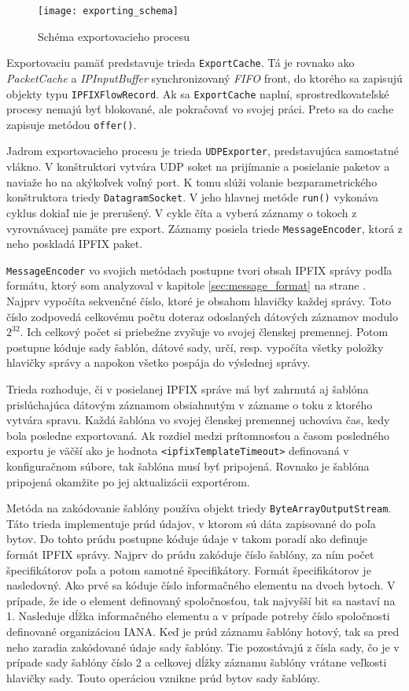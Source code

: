 \begin{figure}[ht!]
\centering
\texttt{[image: exporting\_schema]}
\caption{Schéma exportovacieho procesu}\label{o:exporting_schema}
\end{figure}

Exportovaciu pamäť predstavuje trieda \verb|ExportCache|. Tá je rovnako ako \emph{PacketCache} a 
\emph{IPInputBuffer} synchronizovaný \emph{FIFO} front, do ktorého sa zapisujú objekty typu 
\verb|IPFIXFlowRecord|. Ak sa \verb|ExportCache| naplní, sprostredkovateľské procesy nemajú byť blokované, 
ale pokračovať vo svojej práci. Preto sa do cache zapisuje metódou \verb|offer()|.

Jadrom exportovacieho procesu je trieda \verb|UDPExporter|, predstavujúca samostatné vlákno. V 
konštruktori vytvára UDP soket na prijímanie a posielanie paketov a naviaže ho na akýkoľvek voľný port.
K tomu slúži volanie bezparametrického konštruktora triedy \verb|DatagramSocket|. V jeho hlavnej metóde 
\verb|run()| vykonáva cyklus dokiaľ nie je prerušený. V cykle číta a vyberá záznamy o tokoch z 
vyrovnávacej pamäte pre export. Záznamy posiela triede \verb|MessageEncoder|, ktorá z neho poskladá 
IPFIX paket.

\verb|MessageEncoder| vo svojich metódach postupne tvori obsah IPFIX správy podľa formátu, ktorý som 
analyzoval v kapitole \ref{sec:message_format} na strane \pageref{sec:message_format}. Najprv vypočíta 
sekvenčné číslo, ktoré je obsahom hlavičky každej správy. Toto číslo zodpovedá celkovému počtu doteraz 
odoslaných dátových záznamov modulo $2^{32}$. Ich celkový počet si priebežne zvyšuje vo svojej členskej 
premennej. Potom postupne kóduje sady šablón, dátové sady, určí, resp. vypočíta všetky položky 
hlavičky správy a napokon všetko pospája do výslednej správy.

Trieda rozhoduje, či v posielanej IPFIX správe má byť zahrnutá aj šablóna prislúchajúca dátovým záznamom
obsiahnutým v zázname o toku z ktorého vytvára spravu. Každá šablóna vo svojej členskej premennej uchováva
čas, kedy bola posledne exportovaná. Ak rozdiel medzi prítomnosťou a časom posledného exportu je väčší ako 
je hodnota \verb|<ipfixTemplateTimeout>| definovaná v konfiguračnom súbore, tak šablóna musí byť pripojená.
Rovnako je šablóna pripojená okamžite po jej aktualizácii exportérom. 

Metóda na zakódovanie šablóny používa objekt triedy \verb|ByteArrayOutputStream|. Táto trieda 
implementuje prúd údajov, v ktorom sú dáta zapisované do poľa bytov. Do tohto prúdu postupne kóduje údaje 
v takom poradí ako definuje formát IPFIX správy. Najprv do prúdu zakóduje číslo šablóny, za ním 
počet špecifikátorov poľa a potom samotné špecifikátory. Formát špecifikátorov je nasledovný. Ako prvé sa 
kóduje číslo informačného elementu na dvoch bytoch. V prípade, že ide o element definovaný 
spoločnosťou, tak najvyšší bit sa nastaví na 1. Nasleduje dĺžka informačného elementu a v prípade potreby 
číslo spoločnosti definované organizáciou IANA. Keď je prúd záznamu šablóny hotový, tak sa pred neho 
zaradia zakódované údaje sady šablóny. Tie pozostávajú z čísla sady, čo je v prípade sady šablóny číslo 2
a celkovej dĺžky záznamu šablóny 
vrátane veľkosti hlavičky sady. Touto operáciou vznikne prúd bytov sady šablóny.

